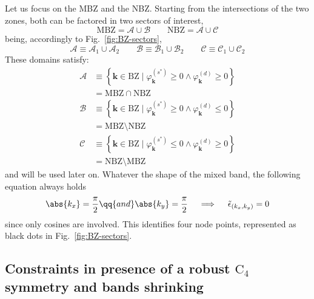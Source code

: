 Let us focus on the MBZ and the NBZ. Starting from the intersections of the two zones, both can be factored in two sectors of interest,
\[
\mathrm{MBZ} = \mathcal{A} \cup \mathcal{B}
\qquad
\mathrm{NBZ} = \mathcal{A} \cup \mathcal{C}
\]
being, accordingly to Fig.~\ref{fig:BZ-sectors},
\[
\mathcal{A} \equiv \mathcal{A}_1 \cup \mathcal{A}_2
\qquad
\mathcal{B} \equiv \mathcal{B}_1 \cup \mathcal{B}_2
\qquad
\mathcal{C} \equiv \mathcal{C}_1 \cup \mathcal{C}_2
\]
These domains satisfy:
\begin{align}
	\mathcal{A} &\equiv \left\lbrace
	\mathbf{k}\in\mathrm{BZ}
	\mid 
	\varphi_\mathbf{k}^{(s^*)} \ge 0 \land 	\varphi_\mathbf{k}^{(d)} \ge 0
	\right\rbrace \label{eq:BZ-A-def} \\
	&= \mathrm{MBZ} \cap \mathrm{NBZ} \nonumber\\[0.5em]
	\mathcal{B} &\equiv \left\lbrace
	\mathbf{k}\in\mathrm{BZ}
	\mid 
	\varphi_\mathbf{k}^{(s^*)} \ge 0 \land 	\varphi_\mathbf{k}^{(d)} \le 0
	\right\rbrace \label{eq:BZ-B-def} \\
	&= \mathrm{MBZ} \setminus \mathrm{NBZ} \nonumber\\[0.5em]
	\mathcal{C} &\equiv \left\lbrace
	\mathbf{k}\in\mathrm{BZ}
	\mid 
	\varphi_\mathbf{k}^{(s^*)} \le 0 \land 	\varphi_\mathbf{k}^{(d)} \ge 0
	\right\rbrace \label{eq:BZ-C-def} \\
	&= \mathrm{NBZ} \setminus \mathrm{MBZ} \nonumber
\end{align}
and will be used later on. Whatever the shape of the mixed band, the following equation always holds
\[
\abs{k_x} = \frac{\pi}{2} \qq{and} \abs{k_y} = \frac{\pi}{2}
\quad\implies\quad
\tilde{\epsilon}_{(k_x,k_y)} = 0
\]
since only cosines are involved. This identifies four node points, represented as black dots in Fig.~\ref{fig:BZ-sectors}.

\subsection{Constraints in presence of a robust $\mathrm{C}_4$ symmetry and bands shrinking}\label{subsec:normal-bands-shrinking}

